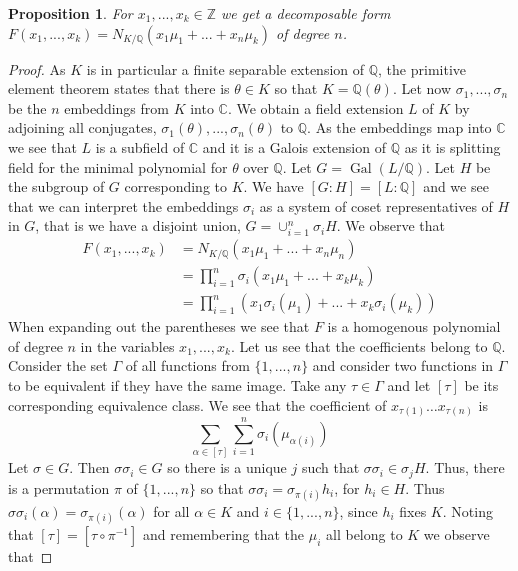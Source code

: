 \documentclass{article}
\DeclareMathOperator{\Gal}{Gal}
\newtheorem{proposition}{Proposition}[section]
\newcommand{\mbb}[1]{\mathbb{#1}}
\numberwithin{equation}{section}
\begin{document}
\begin{proposition}
	For $x_1, ..., x_k \in \mbb Z$ we get a decomposable form $F(x_1, ..., x_k) = N_{K / \mbb Q}(x_1 \mu_1 + ... + x_n \mu_k)$ of degree $n$. %
\end{proposition}
\begin{proof}
    
As $K$ is in particular a finite separable extension of $\mbb Q$, the primitive element theorem states that there is $\theta \in K$ so that $K = \mbb Q(\theta)$. Let now $\sigma_1, ..., \sigma_n$ be the $n$ embeddings from $K$ into $\mbb C$. We obtain a field extension $L$ of $K$ by adjoining all conjugates, $\sigma_1(\theta), ..., \sigma_n(\theta)$ to $\mbb Q$. As the embeddings map into $\mbb C$ we see that $L$ is a subfield of $\mbb C$ and it is a Galois extension of $\mbb Q$ as it is splitting field for the minimal polynomial for $\theta$ over $\mbb Q$. Let $G = \Gal(L/\mbb Q)$. Let $H$ be the subgroup of $G$ corresponding to $K$. We have $[G : H] = [L : \mbb Q]$ and we see that we can interpret the embeddings $\sigma_i$ as a system of coset representatives of $H$ in $G$, that is we have a disjoint union, $G = \cup_{i = 1}^n \sigma_i H$. We observe that
\begin{align*}
	F(x_1, ..., x_k) &= N_{K /\mbb Q}(x_1 \mu_1 + ... + x_n \mu_n)
	\\ &= \prod_{i = 1}^n \sigma_i(x_1 \mu_1 + ... + x_k \mu_k)                     	\\
                 	& = \prod_{i = 1}^n \left(x_1 \sigma_i(\mu_1) + ... + x_k \sigma_i(\mu_k) \right)
\end{align*}
When expanding out the parentheses we see that $F$ is a homogenous polynomial of degree $n$ in the variables $x_1, ..., x_k$. Let us see that the coefficients belong to $\mbb Q$. Consider the set $\Gamma$ of all functions from $\{1, ..., n\}$ and consider two functions in $\Gamma$ to be equivalent if they have the same image. Take any $\tau \in \Gamma$ and let $[\tau]$ be its corresponding equivalence class. We see that the coefficient of $x_{\tau(1)} \ldots x_{\tau(n)}$ is
\begin{equation}
	\sum_{\alpha \in [\tau]} \sum_{i=1}^n \sigma_i(\mu_{\alpha(i)})
\end{equation}
Let $\sigma \in G$. Then $\sigma \sigma_i \in G$ so there is a unique $j$ such that $\sigma \sigma_i \in \sigma_j H$. Thus, there is a permutation $\pi$ of $\{1, ..., n\}$ so that $\sigma \sigma_{i}= \sigma_{\pi(i)}h_i$, for $h_i \in H$. Thus $\sigma \sigma_{i}(\alpha) = \sigma_{\pi(i)}(\alpha)$ for all $\alpha \in K$ and $i \in \{1,...,n\}$, since $h_i$ fixes $K$. Noting that $[\tau]= [\tau \circ \pi^{-1}]$ and remembering that the $\mu_i$ all belong to $K$ we observe that

\end{proof}
\end{document}
